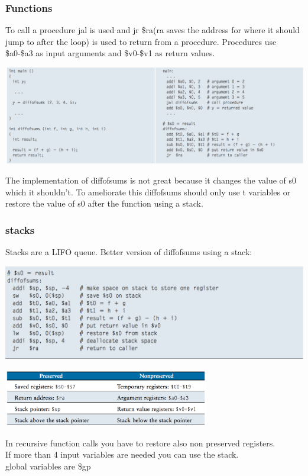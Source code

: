 		\subsubsection{Functions}
		To call a procedure jal is used and jr \$ra(ra saves the address for where it should jump to after the loop) is used to return from a procedure. Procedures use \$a0-\$a3 as input arguments and \$v0-\$v1 as return values.
		\begin{center}
				\includegraphics[width = 18cm]{images/function}
		\end{center}
		The implementation of diffofsums is not great because it changes the value of s0 which it shouldn't. To ameliorate this diffofsums should only use t variables or restore the value of s0 after the function using a stack.
		\subsubsection{stacks}
		Stacks are a LIFO queue. Better version of diffofsums using a stack:
		\begin{center}
				\includegraphics[width = 18cm]{images/stack}
		\end{center}
		\begin{center}
				\includegraphics[width = 9cm]{images/preserved}
		\end{center}
		In recursive function calls you have to restore also non preserved registers.\\
		If more than 4 input variables are needed you can use the stack.\\
		global variables are \$gp
